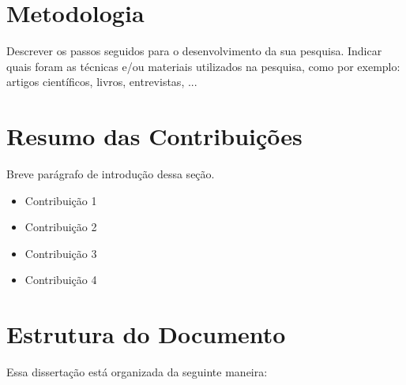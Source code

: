 \documentclass[final]{rc-book-2.14}
\begin{document}
\section{Metodologia}
\label{sec:introduction:methodology}

Descrever os passos seguidos para o desenvolvimento da sua pesquisa. Indicar quais foram as técnicas e/ou materiais utilizados na pesquisa, como por exemplo: artigos científicos, livros, entrevistas, ...


\section{Resumo das Contribuições}
\label{sec:introduction:contributions}

Breve parágrafo de introdução dessa seção.

\begin{itemize}
  \item Contribuição 1
  \item Contribuição 2
  \item Contribuição 3
  \item Contribuição 4
\end{itemize}


\section{Estrutura do Documento}
\label{sec:introduction:general-structure}

Essa dissertação está organizada da seguinte maneira:
\end{document}
